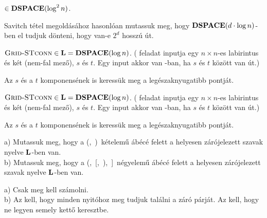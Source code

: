 \begin{Exercise}[counter={sorszam}, difficulty=0]
	$\in \mbox{\ensuremath{\mathbf{DSPACE}}}(\log^2 n)$.
\end{Exercise}	
\begin{Answer}
	Savitch t\'etel megold\'as\'ahoz hasonl\'oan mutassuk meg, hogy $\mbox{\ensuremath{\mathbf{DSPACE}}}(d\cdot \log n)$-ben el tudjuk d\"onteni, hogy van-e $2^d$ hossz\'u \'ut.
\end{Answer}

\begin{Exercise}[counter={sorszam}, difficulty=0]
	$\mbox{\sc{Grid-STconn}} \in \mbox{\ensuremath{\mathbf{L}}}=\mbox{\ensuremath{\mathbf{DSPACE}}}(\log n)$.
	( feladat inputja egy $n\times n$-es labirintus \'es k\'et (nem-fal mez\H o), $s$ \'es $t$.
	Egy input akkor van -ban, ha $s$ \'es $t$ k\"oz\"ott van \'ut.)
\end{Exercise}	
\begin{Answer}
	Az $s$ \'es a $t$ komponens\'enek is keress\"uk meg a leg\'eszaknyugatibb pontj\'at.
\end{Answer}


\begin{Exercise}[counter={sorszam}, difficulty=0]
	$\mbox{\sc{Grid-STconn}} \in \mbox{\ensuremath{\mathbf{L}}}=\mbox{\ensuremath{\mathbf{DSPACE}}}(\log n)$.
	( feladat inputja egy $n\times n$-es labirintus \'es k\'et (nem-fal mez\H o), $s$ \'es $t$.
	Egy input akkor van -ban, ha $s$ \'es $t$ k\"oz\"ott van \'ut.)
\end{Exercise}	
\begin{Answer}
	Az $s$ \'es a $t$ komponens\'enek is keress\"uk meg a leg\'eszaknyugatibb pontj\'at.
\end{Answer}

\begin{Exercise}[counter={sorszam}, difficulty=0]
	a) Mutassuk meg, hogy a (,\ )\ kételem\H u ábécé felett a helyesen zárójelezett szavak nyelve $\mbox{\ensuremath{\mathbf{L}}}$-ben van.\\
	b) Mutassuk meg, hogy a (,\ [,\ ),\ ]\ négyelem\H u ábécé felett a helyesen zárójelezett szavak nyelve $\mbox{\ensuremath{\mathbf{L}}}$-ben van.\\
\end{Exercise}	
\begin{Answer}
	a) Csak meg kell sz\'amolni.\\
	b) Az kell, hogy minden nyit\'ohoz meg tudjuk tal\'alni a z\'ar\'o p\'arj\'at. Az kell, hogy ne legyen semely kett\H o keresztbe.
\end{Answer}

